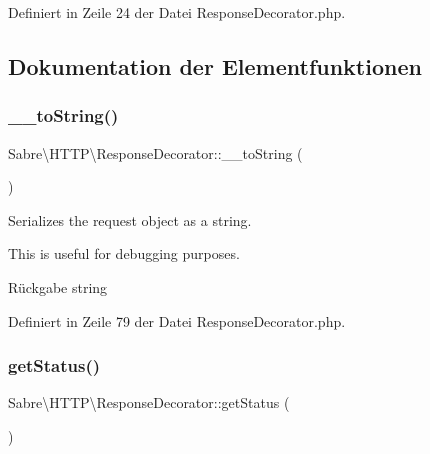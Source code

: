Definiert in Zeile 24 der Datei Response\+Decorator.\+php.



\subsection{Dokumentation der Elementfunktionen}
\mbox{\label{class_sabre_1_1_h_t_t_p_1_1_response_decorator_aa744751810b8ff7cb390fb642f02fbb0}} 
\subsubsection{\texorpdfstring{\+\_\+\+\_\+to\+String()}{\_\_toString()}}
{\footnotesize\ttfamily Sabre\textbackslash{}\+H\+T\+T\+P\textbackslash{}\+Response\+Decorator\+::\+\_\+\+\_\+to\+String (\begin{DoxyParamCaption}{ }\end{DoxyParamCaption})}

Serializes the request object as a string.

This is useful for debugging purposes.

\begin{DoxyReturn}{Rückgabe}
string 
\end{DoxyReturn}


Definiert in Zeile 79 der Datei Response\+Decorator.\+php.

\mbox{\label{class_sabre_1_1_h_t_t_p_1_1_response_decorator_ac5b7d13566a0597fd437ac8d72a5becc}} 
\subsubsection{\texorpdfstring{get\+Status()}{getStatus()}}
{\footnotesize\ttfamily Sabre\textbackslash{}\+H\+T\+T\+P\textbackslash{}\+Response\+Decorator\+::get\+Status (\begin{DoxyParamCaption}{ }\end{DoxyParamCaption})}

